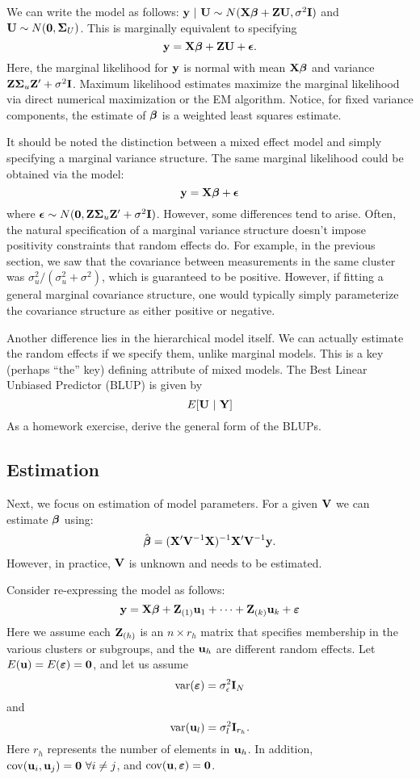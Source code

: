 We can write the model as follows: $\mathbf{y} ~|~ \mathbf{U} \sim N(\mathbf{X} \boldsymbol{\beta} + \mathbf{Z} \mathbf{U}, \sigma^2 \mathbf{I})$ and
$\mathbf{U} \sim N(\mathbf{0}, \boldsymbol{\Sigma}_U)$. This is marginally equivalent to specifying
$$
\mathbf{y} = \mathbf{X} \boldsymbol{\beta} + \mathbf{Z} \mathbf{U} + \boldsymbol{\epsilon}. 
$$
Here, the marginal likelihood for $\mathbf{y}$ is normal with mean $\mathbf{X} \boldsymbol{\beta}$ and
variance $\mathbf{Z} \boldsymbol{\Sigma}_u \mathbf{Z}' + \sigma^2 \mathbf{I}$. Maximum likelihood estimates
maximize the marginal likelihood via direct numerical maximization or 
the EM algorithm. Notice, for fixed variance
components, the estimate of $\boldsymbol{\beta}$ is a weighted least squares estimate.

It should be noted the distinction between a mixed effect model and simply
specifying a marginal variance structure. The same marginal likelihood
could be obtained via the model:
$$
\mathbf{y} = \mathbf{X} \boldsymbol{\beta} + \boldsymbol{\epsilon}
$$
where $\boldsymbol{\epsilon} \sim N(\mathbf{0}, \mathbf{Z} \boldsymbol{\Sigma}_u \mathbf{Z}' + \sigma^2 \mathbf{I})$. However,
some differences tend to arise. Often, the natural specification of a marginal
variance structure doesn't impose positivity constraints that random effects
do. For example, in the previous section, we saw that the covariance between
measurements in the same cluster was $\sigma^2_u / (\sigma^2_u + \sigma^2)$,
which is guaranteed to be positive. However, if fitting a general marginal
covariance structure, one would typically simply parameterize the covariance
structure as either positive or negative. 

Another difference lies in the hierarchical model itself. We can actually
estimate the random effects if we specify them, unlike marginal models.
This is a key (perhaps ``the'' key) defining attribute of mixed models.
The Best Linear Unbiased Predictor (BLUP) is given by
$$
E[\mathbf{U} ~|~ \mathbf{Y}]
$$
As a homework exercise, derive the general form of the BLUPs.


\subsection{Estimation}

Next, we focus on estimation of model parameters. For a given $\mathbf{V}$ we can estimate $\mbox{\boldmath $\beta$}$ using:
$$
{\hat {\mbox{\boldmath $\beta$}}} = (\mathbf{X}'\mathbf{V}^{-1}\mathbf{X})^{-1}\mathbf{X}'\mathbf{V}^{-1}\mathbf{y}.
$$
However, in practice, $\mathbf{V}$ is unknown and needs to be estimated. 


Consider re-expressing the model as follows:
$$
\mathbf{y} = \mathbf{X} \mbox{\boldmath $\beta$} + \mathbf{Z}_{(1)} \mathbf{u}_1 + \cdots + \mathbf{Z}_{(k)} \mathbf{u}_k + \mbox{\boldmath $\varepsilon$}
$$
Here we assume each $\mathbf{Z}_{(h)}$ is an $n \times r_{h}$ matrix that
specifies membership in the various clusters or subgroups, and the $\mathbf{u}_{h}$ are different random effects.
Let $E(\mathbf{u}) = E(\mbox{\boldmath $\varepsilon$}) = \mathbf{0}$, and let us assume 
$$\mathrm{var}(\mbox{\boldmath $\varepsilon$}) = \sigma_\epsilon^2 \mathbf{I}_{N}$$
and
$$\mathrm{var}(\mathbf{u}_l) = \sigma_l^2 \mathbf{I}_{r_h}.$$
Here $r_h$ represents the number of elements in $\mathbf{u}_h$.
In addition, $\mathrm{cov}(\mathbf{u}_i, \mathbf{u}_j) = \mathbf{0}  \, \, \forall i \ne j$, and $\mathrm{cov}(\mathbf{u}, \mbox{\boldmath $\varepsilon$}) = \mathbf{0}$.

